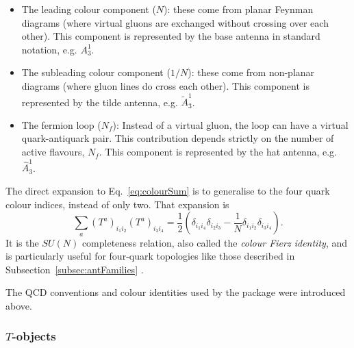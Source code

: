\begin{itemize}\label{list:A31Comps}
    \item The leading colour component ($N$): these come from planar Feynman 
    diagrams (where virtual gluons are exchanged without crossing over each other).
    This component is represented by the base antenna in standard notation, e.g. 
    $A_3^1$.
    \item The subleading colour component ($1/N$): these come from non-planar
    diagrams (where gluon lines do cross each other). This component is represented
    by the tilde antenna, e.g. $\tilde A_3^1$.
    \item The fermion loop ($N_f$): Instead of a virtual gluon, the loop can have
    a virtual quark-antiquark pair. This contribution depends strictly on the number
    of active flavours, $N_f$. This component is represented by the hat antenna,
    e.g. $\hat A_3^1$\cite{Gehrmann-DeRidder:2005btv}.
\end{itemize}

The direct expansion to Eq.~\eqref{eq:colourSum} is to generalise to the four quark
colour indices, instead of only two. That expansion is 
\begin{equation}\label{eq:genTSum}
    \sum_a\left(T^a\right)_{i_1i_2}\left(T^a\right)_{i_3i_4}=\frac12\left(\delta_{i_1i_4}\delta_{i_2i_3}-\frac1N\delta_{i_1i_2}\delta_{i_3i_4}\right).
\end{equation}
It is the $SU(N)$ completeness relation, also called the \textit{colour Fierz identity},
and is particularly useful for four-quark
topologies like those described in Subsection~\ref{subsec:antFamilies}
\cite{Ellis:1996mzs, Schwartz:2014sze}.

The QCD conventions and colour identities used by the package were introduced above.

\subsubsection{$T$-objects}


